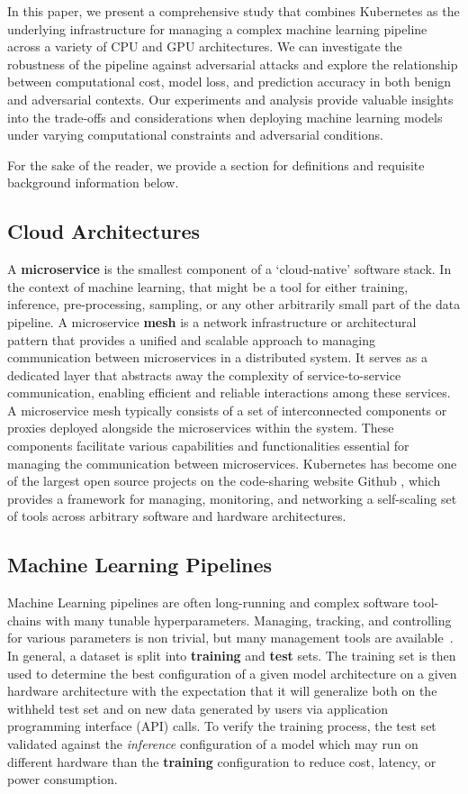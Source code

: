 \documentclass[conference]{IEEEtran}
\begin{document}
In this paper, we present a comprehensive study that combines Kubernetes as the underlying infrastructure for managing a complex machine learning pipeline across a variety of CPU and GPU architectures. We can investigate the robustness of the pipeline against adversarial attacks and explore the relationship between computational cost, model loss, and  prediction accuracy in both benign and adversarial contexts. Our experiments and analysis provide valuable insights into the trade-offs and considerations when deploying machine learning models under varying computational constraints and adversarial conditions.


For the sake of the reader, we provide a section for definitions and requisite background information below.

\subsection{Cloud Architectures}
A \textbf{microservice} is the smallest component of a `cloud-native' software stack. In the context of machine learning, that might be a tool for either training, inference, pre-processing, sampling, or any other arbitrarily small part of the data pipeline. A microservice \textbf{mesh} is a network infrastructure or architectural pattern that provides a unified and scalable approach to managing communication between microservices in a distributed system. It serves as a dedicated layer that abstracts away the complexity of service-to-service communication, enabling efficient and reliable interactions among these services. A microservice mesh typically consists of a set of interconnected components or proxies deployed alongside the microservices within the system. These components facilitate various capabilities and functionalities essential for managing the communication between microservices. Kubernetes has become one of the largest open source projects on the code-sharing website Github \cite{k8s-size}, which provides a framework for managing, monitoring, and networking a self-scaling set of tools across arbitrary software and hardware architectures.

\subsection{Machine Learning Pipelines}
Machine Learning pipelines are often long-running and complex software tool-chains with many tunable hyperparameters. Managing, tracking, and controlling for various parameters is non trivial, but many management tools are available~\cite{dvc, hydra, k8s}. In general, a dataset is split into \textbf{training} and \textbf{test} sets. The training set is then used to determine the best configuration of a given model architecture on a given hardware architecture with the expectation that it will generalize both on the withheld test set and on new data generated by users via application programming interface (API) calls. To verify the training process, the test set validated against the \textit{inference} configuration of a model which may run on different hardware than the \textbf{training} configuration to reduce cost, latency, or power consumption. 
\end{document}

